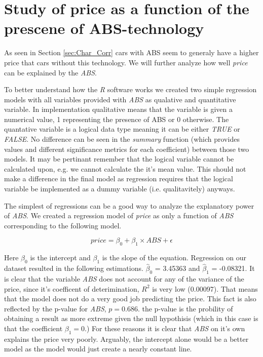 \section{Study of price as a function of the prescene of ABS-technology} %
\label{sec:price_abs}

As seen in Section \ref{sec:Char_Corr} cars with ABS seem to generaly have a higher price that cars without this technology. We will further analyze how well \textit{price} can be explained by the \textit{ABS}.

\noindent
To better understand how the \textit{R} software works we created two simple regression models with all variables provided with \textit{ABS} as qualative and quantitative variable. In implementation qualitative means that the variable is given a numerical value, 1 representing the presence of ABS or 0 otherwise. The quantative variable is a logical data type meaning it can be either \textit{TRUE} or \textit{FALSE}. No difference can be seen in the \textit{summary} function (which provides values and different significance metrics for each coefficient) between those two models. It may be pertinant remember that the logical variable cannot be calculated upon, e.g. we cannot calculate the it's mean value. This should not make a difference in the final model as regression requires that the logical variable be implemented as a dummy variable (i.e. qualitavitely) anyways.

\noindent
The simplest of regressions can be a good way to analyze the explanatory power of \textit{ABS}. We created a regression model of \textit{price} as only a function of \textit{ABS} corresponding to the following model.

\begin{equation}
	price = \beta_0 + \beta_1 \times ABS + \epsilon
\end{equation}

\noindent
Here $\beta_0$ is the intercept and $\beta_1$ is the slope of the equation. Regression on our dataset resulted in the following estimations. $\hat{\beta}_0$ = 3.45363 and $\hat{\beta}_1$ = -0.08321. It is clear that the variable \textit{ABS} does not account for any of the variance of the price, since it's coefficent of deterimination, $R^2$ is very low (0.00097). That means that the model does not do a very good job predicting the price. This fact is also reflected by the p-value for \textit{ABS}, $p=0.686$. the p-value is the probility of obtaining a result as more extreme given the null hypothisis (which in this case is that the coefficient $\beta_1 = 0$.) For these reasons it is clear that \textit{ABS} on it's own explains the price very poorly. Arguably, the intercept alone would be a better model as the model
would just create a nearly constant line.

